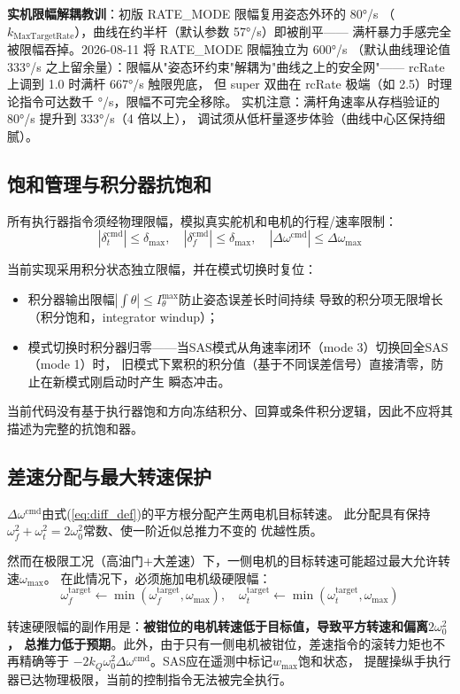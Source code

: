 \textbf{实机限幅解耦教训}：初版 RATE\_MODE 限幅复用姿态外环的 80°/s
（$k_{\text{MaxTargetRate}}$），曲线在约半杆（默认参数 57°/s）即被削平——
满杆暴力手感完全被限幅吞掉。2026-08-11 将 RATE\_MODE 限幅独立为 600°/s
（默认曲线理论值 333°/s 之上留余量）：限幅从"姿态环约束"解耦为"曲线之上的安全网"——
rcRate 上调到 1.0 时满杆 667°/s 触限兜底，
但 super 双曲在 rcRate 极端（如 2.5）时理论指令可达数千 °/s，限幅不可完全移除。
实机注意：满杆角速率从存档验证的 80°/s 提升到 333°/s（4 倍以上），
调试须从低杆量逐步体验（曲线中心区保持细腻）。

\subsection{饱和管理与积分器抗饱和}

所有执行器指令须经物理限幅，模拟真实舵机和电机的行程/速率限制：
\begin{equation}
    |\delta_t^{\text{cmd}}| \leq \delta_{\max}, \quad
    |\delta_f^{\text{cmd}}| \leq \delta_{\max}, \quad
    |\Delta\omega^{\text{cmd}}| \leq \Delta\omega_{\max}
    \label{eq:actuator_limits}
\end{equation}

当前实现采用积分状态独立限幅，并在模式切换时复位：
\begin{itemize}
    \item 积分器输出限幅$|\int \theta| \leq I_\theta^{\max}$防止姿态误差长时间持续
          导致的积分项无限增长（积分饱和，integrator windup）；
    \item 模式切换时积分器归零——当SAS模式从角速率闭环（mode 3）切换回全SAS（mode 1）时，
          旧模式下累积的积分值（基于不同误差信号）直接清零，防止在新模式刚启动时产生
          瞬态冲击。
\end{itemize}
当前代码没有基于执行器饱和方向冻结积分、回算或条件积分逻辑，因此不应将其描述为完整的抗饱和器。

\subsection{差速分配与最大转速保护}

$\Delta\omega^{\text{cmd}}$由式(\ref{eq:diff_def})的平方根分配产生两电机目标转速。
此分配具有保持$\omega_f^2 + \omega_t^2 = 2\omega_0^2$常数、使一阶近似总推力不变的
优越性质。

然而在极限工况（高油门+大差速）下，一侧电机的目标转速可能超过最大允许转速$\omega_{\max}$。
在此情况下，必须施加电机级硬限幅：
\begin{equation}
    \omega_f^{\text{target}} \leftarrow \min(\omega_f^{\text{target}}, \omega_{\max}), \quad
    \omega_t^{\text{target}} \leftarrow \min(\omega_t^{\text{target}}, \omega_{\max})
    \label{eq:max_clamp}
\end{equation}

转速硬限幅的副作用是：\textbf{被钳位的电机转速低于目标值，导致平方转速和偏离$2\omega_0^2$，
总推力低于预期}。此外，由于只有一侧电机被钳位，差速指令的滚转力矩也不再精确等于
$-2k_Q\omega_0^2\Delta\omega^{\text{cmd}}$。SAS应在遥测中标记$w_{\max}$饱和状态，
提醒操纵手执行器已达物理极限，当前的控制指令无法被完全执行。
